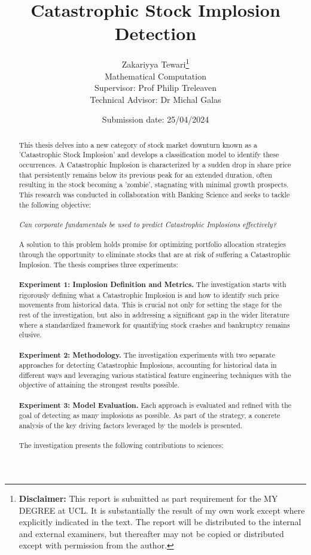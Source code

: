 \documentclass[a4paper]{report}
\title{\vspace{-14em}\Huge Catastrophic Stock Implosion Detection}
\date{Submission date: 25/04/2024}
\author{%
    Zakariyya Tewari\thanks{%
    \textbf{Disclaimer:}
    This report is submitted as part requirement for the MY DEGREE at UCL. It is substantially the result of my own work except where explicitly indicated in the text.
    The report will be distributed to the internal and external examiners, but thereafter may not be copied or distributed except with permission from the author.}
    \\[1cm]
    \large Mathematical Computation\\[0.5cm]
    \large Supervisor: Prof Philip Treleaven\\[0.5cm]
    \large Technical Advisor: Dr Michal Galas
}
\begin{document}
\onehalfspacing
\maketitle

\begin{abstract}
  This thesis delves into a new category of stock market downturn known as a 'Catastrophic Stock Implosion' and develops a classification model to identify these occurrences. 
  A Catastrophic Implosion is characterized by a sudden drop in share price that persistently remains below its previous peak for an extended duration, often resulting in the stock 
  becoming a 'zombie', stagnating with minimal growth prospects.
  This research was conducted in collaboration with Banking Science and seeks to tackle the following objective:\\\\\textit{Can corporate
  fundamentals be used to predict Catastrophic Implosions effectively?}\\\\A solution to this problem holds promise for optimizing portfolio allocation strategies through the opportunity to eliminate stocks that are at risk of suffering a Catastrophic Implosion.
  The thesis comprises three experiments:
  \\\\ {\bfseries Experiment 1: Implosion Definition and Metrics.} The investigation starts with rigorously defining what a Catastrophic Implosion is and how to identify such price movements from historical data. This is crucial not only for setting the stage for the rest of the investigation, but also in addressing a significant gap in the wider literature 
  where a standardized framework for quantifying stock crashes and bankruptcy remains elusive.
  \\\\ {\bfseries Experiment 2: Methodology.} The investigation experiments with two separate approaches for detecting Catastrophic Implosions, accounting for historical data in different ways and leveraging various statistical feature engineering techniques with the objective 
  of attaining the strongest results possible.
  \\\\ {\bfseries Experiment 3: Model Evaluation.} Each approach is evaluated and refined with the goal of detecting as many implosions as possible. As part of the strategy, a concrete analysis of the key driving factors leveraged by the models is presented.
  \\\\The investigation presents the following contributions to sciences:

\end{abstract}
\end{document}
